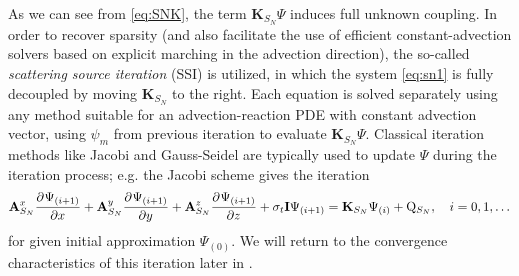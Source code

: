 As we can see from \eqref{eq:SNK}, the term $\mathbf{K}_{S_N}\Psi$ induces full unknown coupling. In order to recover 
sparsity (and also facilitate the use of efficient constant-advection solvers based on explicit marching in the advection direction), the so-called  \textit{scattering
source iteration} (SSI)  is utilized, in which the system \eqref{eq:sn1} is
fully decoupled by moving $\mathbf{K}_{S_N}$ to the right. Each equation is solved separately using any method suitable for an advection-reaction PDE with constant
advection vector, using $\psi_m$ from previous iteration to evaluate $\mathbf{K}_{S_N}\Psi$. Classical iteration methods
like Jacobi and Gauss-Seidel are typically used to update $\Psi$ during the iteration process; e.g. the Jacobi scheme 
gives the iteration
\begin{equation}\label{eq:SI}
	\mathbf{A}_{S_N}^x\frac{\partial^{}\Psi_{(i+1)}}{\partial x^{}} + \mathbf{A}_{S_N}^y\frac{\partial^{}\Psi_{(i+1)}}{\partial y^{}} +
	\mathbf{A}_{S_N}^z\frac{\partial^{}\Psi_{(i+1)}}{\partial z^{}} + \sigma_t\mathbf{I}\Psi_{(i+1)}= \mathbf{K}_{S_N}\Psi_{(i)} +
	\mathrm{Q}_{S_N},\quad
	i = 0,1,\ldots
\end{equation}
for given initial approximation $\Psi_{(0)}$. We will return to the convergence characteristics of this iteration later
in .

